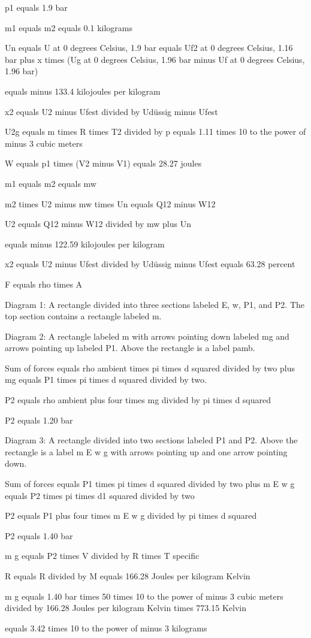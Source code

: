 p1 equals 1.9 bar

m1 equals m2 equals 0.1 kilograms

Un equals U at 0 degrees Celsius, 1.9 bar equals Uf2 at 0 degrees Celsius, 1.16 bar plus x times (Ug at 0 degrees Celsius, 1.96 bar minus Uf at 0 degrees Celsius, 1.96 bar)

equals minus 133.4 kilojoules per kilogram

x2 equals U2 minus Ufest divided by Udüssig minus Ufest

U2g equals m times R times T2 divided by p equals 1.11 times 10 to the power of minus 3 cubic meters

W equals p1 times (V2 minus V1) equals 28.27 joules

m1 equals m2 equals mw

m2 times U2 minus mw times Un equals Q12 minus W12

U2 equals Q12 minus W12 divided by mw plus Un

equals minus 122.59 kilojoules per kilogram

x2 equals U2 minus Ufest divided by Udüssig minus Ufest equals 63.28 percent

F equals rho times A

Diagram 1:
A rectangle divided into three sections labeled E, w, P1, and P2. The top section contains a rectangle labeled m.

Diagram 2:
A rectangle labeled m with arrows pointing down labeled mg and arrows pointing up labeled P1. Above the rectangle is a label pamb.

Sum of forces equals rho ambient times pi times d squared divided by two plus mg equals P1 times pi times d squared divided by two.

P2 equals rho ambient plus four times mg divided by pi times d squared

P2 equals 1.20 bar

Diagram 3:
A rectangle divided into two sections labeled P1 and P2. Above the rectangle is a label m E w g with arrows pointing up and one arrow pointing down.

Sum of forces equals P1 times pi times d squared divided by two plus m E w g equals P2 times pi times d1 squared divided by two

P2 equals P1 plus four times m E w g divided by pi times d squared

P2 equals 1.40 bar

m g equals P2 times V divided by R times T specific

R equals R divided by M equals 166.28 Joules per kilogram Kelvin

m g equals 1.40 bar times 50 times 10 to the power of minus 3 cubic meters divided by 166.28 Joules per kilogram Kelvin times 773.15 Kelvin

equals 3.42 times 10 to the power of minus 3 kilograms